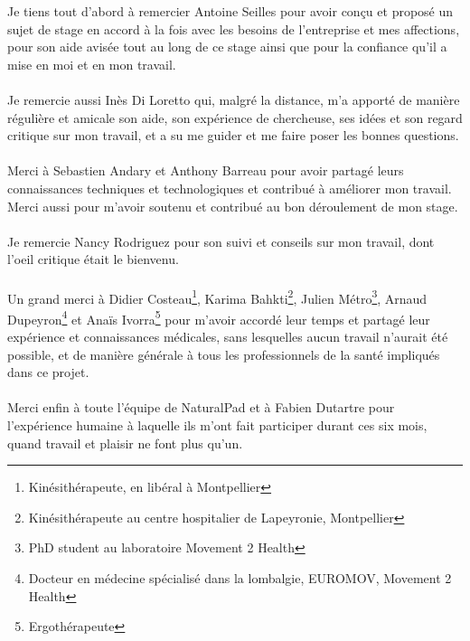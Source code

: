 Je tiens tout d'abord à remercier Antoine Seilles pour avoir conçu et proposé un sujet de stage en accord à la fois avec les besoins de l'entreprise et mes affections, pour son aide avisée tout au long de ce stage ainsi que pour la confiance qu'il a mise en moi et en mon travail.

\paragraph{}Je remercie aussi Inès Di Loretto qui, malgré la distance, m'a apporté de manière régulière et amicale son aide, son expérience de chercheuse, ses idées et son regard critique sur mon travail, et a su me guider et me faire poser les bonnes questions.

\paragraph{}Merci à Sebastien Andary et Anthony Barreau pour avoir partagé leurs connaissances techniques et technologiques et contribué à améliorer mon travail. Merci aussi pour m'avoir soutenu et contribué au bon déroulement de mon stage.

\paragraph{}Je remercie Nancy Rodriguez pour son suivi et conseils sur mon travail, dont l'oeil critique était le bienvenu.

\paragraph{}Un grand merci à Didier Costeau\footnote{Kinésithérapeute, en libéral à Montpellier}, Karima Bahkti\footnote{Kinésithérapeute au centre hospitalier de Lapeyronie, Montpellier}, Julien Métro\footnote{PhD student au laboratoire Movement 2 Health}, Arnaud Dupeyron\footnote{Docteur en médecine spécialisé dans la lombalgie, EUROMOV, Movement 2 Health} et Anaïs Ivorra\footnote{Ergothérapeute} pour m'avoir accordé leur temps et partagé leur expérience et connaissances médicales, sans lesquelles aucun travail n'aurait été possible, et de manière générale à tous les professionnels de la santé impliqués dans ce projet.

\paragraph{}Merci enfin à toute l'équipe de NaturalPad et à Fabien Dutartre pour l'expérience humaine à laquelle ils m'ont fait participer durant ces six mois, quand travail et plaisir ne font plus qu'un.